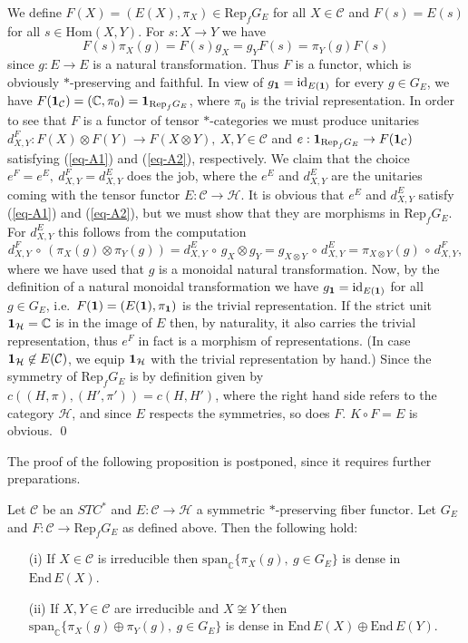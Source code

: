 \documentclass[11pt]{article}
\theoremstyle{definition}
\theoremstyle{definition}
\theoremstyle{remark}
\def\2#1{{\mathcal #1}}
\def\7#1{{\mathbb #1}}
\def\1#1{{\bf #1}}
\newcommand{\Hom}{\mathrm{Hom}}
\newcommand{\End}{\mathrm{End}}
\newcommand{\Rep}{\mathrm{Rep}}
\newcommand{\mcirc}{\,\circ\,}
\newcommand{\rarr}{\rightarrow}
\def\id{\mathrm{id}}
\begin{document}
\prf We define $F(X)=(E(X),\pi_X)\in\Rep_fG_E$ for all $X\in\2C$ and $F(s)=E(s)$ for all
$s\in\Hom(X,Y)$. For $s:X\rarr Y$ we have
\[ F(s) \pi_X(g)=F(s)g_X=g_YF(s)=\pi_Y(g)F(s) \]
since $g:E\rarr E$ is a natural transformation. Thus $F$ is a functor, which is obviously
$*$-preserving and faithful. In view of $g_\11=\id_{E(\11)}$ for every $g\in G_E$, we have
$F(\11_\2C)=(\7C,\pi_0)=\11_{\Rep_fG_E}$, where $\pi_0$ is the trivial representation. In order to
see that $F$ is a functor of tensor $*$-categories we must produce unitaries 
$d^F_{X,Y}: F(X)\otimes F(Y)\rarr F(X\otimes Y),\ X,Y\in\2C$ and 
$e:\11_{\Rep_fG_E}\rarr F(\11_\2C)$ satisfying (\ref{eq-A1}) and (\ref{eq-A2}), respectively.
We claim that the choice $e^F=e^E, \ d^F_{X,Y}=d^E_{X,Y}$ does the job, where the $e^E$ and
$d^E_{X,Y}$ are the unitaries coming with the tensor functor $E:\2C\rarr\2H$. It is obvious that  
$e^E$ and $d^E_{X,Y}$ satisfy (\ref{eq-A1}) and (\ref{eq-A2}), but we must show that they are
morphisms in $\Rep_fG_E$. For $d^E_{X,Y}$ this follows from the computation
\[ d^F_{X,Y}\mcirc (\pi_X(g)\otimes\pi_Y(g))=d^E_{X,Y}\mcirc g_X\otimes g_Y
   =g_{X\otimes Y}\mcirc d^E_{X,Y}=\pi_{X\otimes Y}(g)\mcirc d^F_{X,Y}, \]
where we have used that $g$ is a monoidal natural transformation. Now, by the definition of a
natural monoidal transformation we have $g_\11=\id_{E(\11)}$ for all $g\in G_E$, i.e.\
$F(\11)=(E(\11),\pi_\11)$ is the trivial representation. If the strict unit $\11_\2H=\7C$ is in the
image of $E$ then, by naturality, it also carries the trivial representation, thus $e^F$ in fact is
a morphism of representations. (In case $\11_\2H\not\in E(\2C)$, we equip $\11_\2H$ with the trivial
representation by hand.) Since the symmetry of $\Rep_fG_E$ is by definition given by
$c((H,\pi),(H',\pi'))=c(H,H')$, where the right hand side refers to the category $\2H$, and since
$E$ respects the symmetries, so does $F$. $K\circ F=E$ is obvious.
\qed

The proof of the following proposition is postponed, since it requires further preparations.

\bprop \label{prop-dense}
Let $\2C$ be an $STC^*$ and $E:\2C\rarr\2H$ a symmetric $*$-preserving fiber functor. Let $G_E$ and 
$F:\2C\rarr\Rep_fG_E$ as defined above. Then the following hold:
\begin{itemize}
\item[(i)] If $X\in\2C$ is irreducible then $\mathrm{span}_\7C\{ \pi_X(g),\ g\in G_E\}$ is dense in
  $\End\,E(X)$. 
\item[(ii)] If $X,Y\in\2C$ are irreducible and $X\not\cong Y$ then 
$\mathrm{span}_\7C\{ \pi_X(g)\oplus\pi_Y(g),\ g\in G_E\}$ is dense in $\End\,E(X)\oplus\End\,E(Y)$.
\end{itemize}
\eprop
\end{document}
